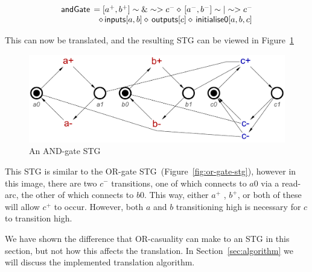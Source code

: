 \documentclass[british, journal]{IEEEtran}
\begin{document}
 \[
\begin{array}{lcl}
\mathsf{andGate}&\hspace{-2mm}=[a^{+}, b^{+}] \sim\&\sim> c^{-} \diamond\, [a^{-}, b^{-}] \sim|\sim> c^{-} \\
&\diamond\, \mathsf{inputs}[a, b] \diamond\, \mathsf{outputs}[c] \diamond\, \mathsf{initialise0} [a, b, c]
\end{array}
\]

This can now be translated, and the resulting STG can be viewed in Figure~\ref{fig:and-gate-stg}

\begin{figure}[h]
\begin{centering}
\includegraphics[scale=0.32]{Images/and-gate-stg}
\par\end{centering}
\vspace{-1mm}
\protect\caption{\label{fig:and-gate-stg} An AND-gate STG}
\vspace{-3mm}
\end{figure}

This STG is similar to the OR-gate STG~(Figure~\ref{fig:or-gate-stg}), however
in this image, there are two $c^{-}$ transitions, one of which connects to $a0$
via a read-arc, the other of which connects to $b0$. This way, either $a^{+}$ 
, $b^{+}$, or both of these will allow $c^{+}$ to occur. However, both $a$ and
$b$ transitioning high is necessary for $c$ to transition high. 

We have shown the difference that OR-casuality can make to an STG in this
section, but not how this affects the translation. In Section~\ref{sec:algorithm} we 
will discuss the implemented translation algorithm. 
\end{document}
